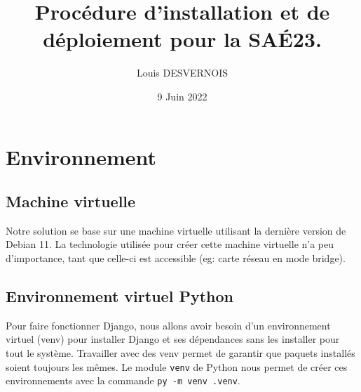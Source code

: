 \documentclass{article}
\author{Louis DESVERNOIS}
\title{Procédure d'installation et de déploiement pour la SAÉ23.}
\date{9 Juin 2022}
\begin{document}
    \maketitle
    \tableofcontents
    \listoffigures
    \newpage
    \section{Environnement}
        \subsection{Machine virtuelle}
            Notre solution se base sur une machine virtuelle utilisant la dernière version de Debian 11. La technologie utilisée pour créer cette machine virtuelle n'a peu d'importance, tant que celle-ci est accessible (eg: carte réseau en mode bridge).
        \subsection{Environnement virtuel Python}
            Pour faire fonctionner Django, nous allons avoir besoin d'un environnement virtuel (venv) pour installer Django et ses dépendances sans les installer pour tout le système. Travailler avec des venv permet de garantir que paquets installés soient toujours les mêmes. Le module \verb|venv| de Python nous permet de créer ces environnements avec la commande \verb|py -m venv .venv|.
\end{document}
